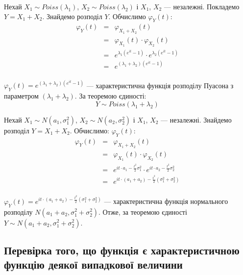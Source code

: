 \begin{example}
    Нехай $X_1 \sim Poiss(\lambda_1)$, $X_2 \sim Poiss(\lambda_2)$ і
    $X_1$, $X_2$ --- незалежні.
    Покладемо $Y = X_1 + X_2$.
    Знайдемо розподіл $Y$.
    Обчислимо $\varphi_Y(t)$:
    $$\begin{array}{rcl}
        \varphi_Y(t) & = & \varphi_{X_1 + X_2}(t) \\
        & = & \varphi_{X_1}(t) \cdot \varphi_{X_2}(t) \\
        & = & e^{\lambda_1 (e^{it} - 1)} \cdot e^{\lambda_2 (e^{it} - 1)} \\
        & = & e^{(\lambda_1 + \lambda_2)(e^{it} - 1)} \\
    \end{array}$$
    
    $\varphi_Y(t) = e^{(\lambda_1 + \lambda_2)(e^{it} - 1)}$
    --- характеристична функція розподілу Пуасона
    з параметром $(\lambda_1 + \lambda_2)$.
    За теоремою єдиності:
    $$Y \sim Poiss(\lambda_1 + \lambda_2)$$
\end{example}

\begin{example}
    Нехай $X_1 \sim N(a_1, \sigma_1^2)$, $X_2 \sim N(a_2, \sigma_2^2)$ і
    $X_1$, $X_2$ --- незалежні.
    Знайдемо розподіл $Y = X_1 + X_2$. 
    Обчислимо: $\varphi_Y(t)$:
    $$\begin{array}{rcl}
        \varphi_Y(t) & = & \varphi_{X_1 + X_2}(t) \\
        & = & \varphi_{X_1}(t) \cdot \varphi_{X_2}(t) \\
        & = & e^{it \cdot a_1 - \frac{t^2}{2}\sigma_1^2} \cdot e^{it \cdot a_2 - \frac{t^2}{2}\sigma_2^2} \\
        & = & e^{it \cdot (a_1+a_2) - \frac{t^2}{2}(\sigma_1^2 + \sigma_2^2)} \\
    \end{array}$$
    
    $\varphi_Y(t) = e^{it \cdot (a_1+a_2) - \frac{t^2}{2}(\sigma_1^2 + \sigma_2^2)}$
    --- характеристична функція нормального розподілу $N(a_1 + a_2, \sigma_1^2 + \sigma_2^2)$.
    Отже, за теоремою єдиності $Y \sim N(a_1 + a_2, \sigma_1^2 + \sigma_2^2)$.
\end{example}

\subsection{Перевірка того, що функція є характеристичною функцію деякої випадкової величини}

